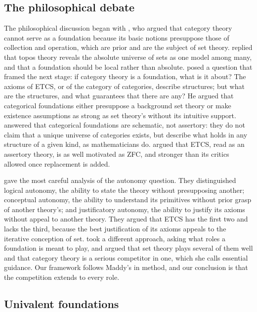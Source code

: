 \documentclass{situationist-preprint}
\begin{document}
\subsection{The philosophical debate}

The philosophical discussion began with \citet{Feferman1977}, who argued that category theory cannot serve as a foundation because its basic notions presuppose those of collection and operation, which are prior and are the subject of set theory. \citet{Bell1981} replied that topos theory reveals the absolute universe of sets as one model among many, and that a foundation should be local rather than absolute. \citet{Hellman2003} posed a question that framed the next stage: if category theory is a foundation, what is it about? The axioms of ETCS, or of the category of categories, describe structures; but what are the structures, and what guarantees that there are any? He argued that categorical foundations either presuppose a background set theory or make existence assumptions as strong as set theory's without its intuitive support. \citet{Awodey2004} answered that categorical foundations are schematic, not assertory: they do not claim that a unique universe of categories exists, but describe what holds in any structure of a given kind, as mathematicians do. \citet{McLarty2004,McLarty2005} argued that ETCS, read as an assertory theory, is as well motivated as ZFC, and stronger than its critics allowed once replacement is added.

\citet{LinneboPettigrew2011} gave the most careful analysis of the autonomy question. They distinguished logical autonomy, the ability to state the theory without presupposing another; conceptual autonomy, the ability to understand its primitives without prior grasp of another theory's; and justificatory autonomy, the ability to justify its axioms without appeal to another theory. They argued that ETCS has the first two and lacks the third, because the best justification of its axioms appeals to the iterative conception of set. \citet{Maddy2017,Maddy2019} took a different approach, asking what roles a foundation is meant to play, and argued that set theory plays several of them well and that category theory is a serious competitor in one, which she calls essential guidance. Our framework follows Maddy's in method, and our conclusion is that the competition extends to every role.

\subsection{Univalent foundations}
\end{document}
